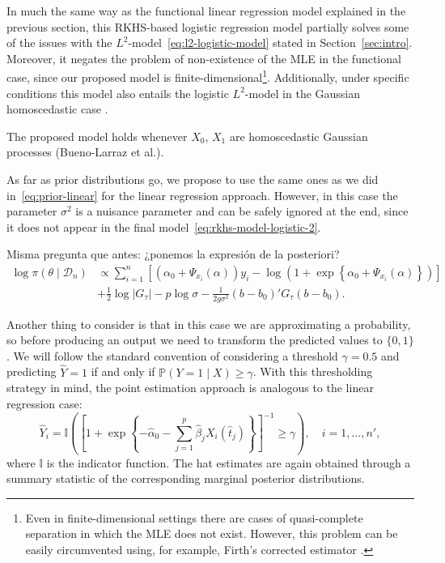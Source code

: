 \documentclass[ba]{imsart}
\numberwithin{equation}{section}
\theoremstyle{plain}
\newenvironment{comment}[1][comment-red]
{
\noindent \color{#1}
}
{
\color{black}
}
\begin{document}
In much the same way as the functional linear regression model explained in the previous section, this RKHS-based logistic regression model partially solves some of the issues with the \(L^2\)-model~\eqref{eq:l2-logistic-model} stated in Section~\ref{sec:intro}. Moreover, it negates the problem of non-existence of the MLE in the functional case, since our proposed model is finite-dimensional\footnote{Even in finite-dimensional settings there are cases of quasi-complete separation in which the MLE does not exist. However, this problem can be easily circumvented using, for example, Firth's corrected estimator \citep{firth1993bias}.}. Additionally, under specific conditions this model also entails the logistic \(L^2\)-model in the Gaussian homoscedastic case \citep[see][Th.~1]{berrendero2021functional}.

\begin{comment}
  The proposed model holds whenever \(X_0\), \(X_1\) are homoscedastic Gaussian processes (Bueno-Larraz et al.).
\end{comment}

As far as prior distributions go, we propose to use the same ones as we did in~\eqref{eq:prior-linear} for the linear regression approach. However, in this case the parameter \(\sigma^2\) is a nuisance parameter and can be safely ignored at the end, since it does not appear in the final model~\eqref{eq:rkhs-model-logistic-2}.

\begin{comment}
  Misma pregunta que antes: ¿ponemos la expresión de la posteriori?
  \begin{align*}
\log \pi(\theta \mid \mathcal D_n) & \propto \sum_{i=1}^n \left[ \left(\alpha_0 + \Psi_{x_i}(\alpha)\right)y_i - \log\left(1 + \exp\left\{\alpha_0 + \Psi_{x_i}(\alpha)\right\}\right)\right]\\
\quad &+ \frac{1}{2}\log |G_\tau| - p\log \sigma -\frac{1}{2g\sigma^2} (b - b_0)'G_\tau(b - b_0).
\end{align*}

\end{comment}

Another thing to consider is that in this case we are approximating a probability, so before producing an output we need to transform the predicted values to \(\{0, 1\}\). We will follow the standard convention of considering a threshold \(\gamma = 0.5\) and predicting \(\hat Y=1\) if and only if \(\mathbb P(Y=1\mid X) \geq \gamma\). With this thresholding strategy in mind, the point estimation approach is analogous to the linear regression case:
\[
\hat Y_i = \mathbb I \left( \left[\displaystyle 1 + \exp\left\{-\hat\alpha_0 - \sum_{j=1}^p \hat\beta_j X_i(\hat t_j)\right\}\right]^{-1} \geq \gamma \right), \quad i=1,\dots,n',
\]
where \(\mathbb I\) is the indicator function. The hat estimates are again obtained through a summary statistic of the corresponding marginal posterior distributions.
\end{document}
